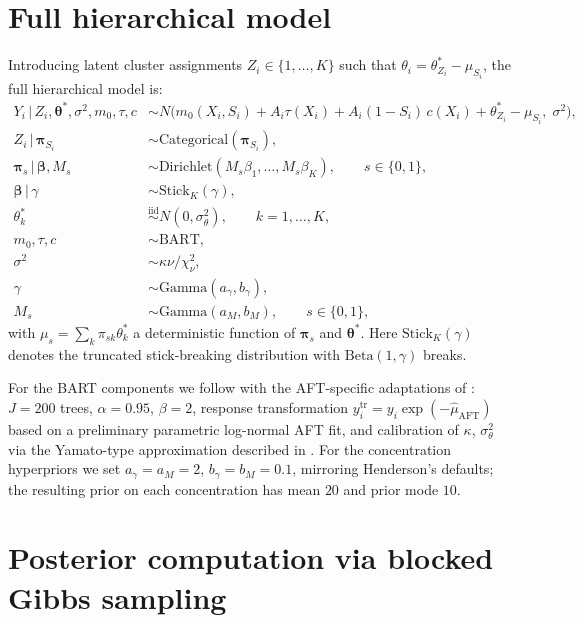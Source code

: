 \documentclass[11pt]{article}
\theoremstyle{plain}
\theoremstyle{definition}
\theoremstyle{remark}
\newcommand{\1}{\mathds{1}}
\newcommand{\given}{\,|\,}
\begin{document}
\section{Full hierarchical model}

Introducing latent cluster assignments $Z_i \in \{1, \ldots, K\}$ such that $\theta_i = \theta_{Z_i}^* - \mu_{S_i}$, the full hierarchical model is:
\begin{align}
Y_i \given Z_i, \bm{\theta}^*, \sigma^2, m_0, \tau, c &\sim N\!\big(m_0(X_i, S_i) + A_i \tau(X_i) + A_i(1 - S_i)\, c(X_i) + \theta_{Z_i}^* - \mu_{S_i},\; \sigma^2\big), \label{eq:lik} \\
Z_i \given \bm{\pi}_{S_i} &\sim \mathrm{Categorical}(\bm{\pi}_{S_i}), \\
\bm{\pi}_s \given \bm{\beta}, M_s &\sim \mathrm{Dirichlet}(M_s \beta_1, \ldots, M_s \beta_K), \qquad s \in \{0, 1\}, \\
\bm{\beta} \given \gamma &\sim \mathrm{Stick}_K(\gamma), \\
\theta_k^* &\stackrel{\mathrm{iid}}{\sim} N(0, \sigma_\theta^2), \qquad k = 1, \ldots, K, \\
m_0, \tau, c &\sim \mathrm{BART}, \\
\sigma^2 &\sim \kappa\nu / \chi^2_\nu, \\
\gamma &\sim \mathrm{Gamma}(a_\gamma, b_\gamma), \\
M_s &\sim \mathrm{Gamma}(a_M, b_M), \qquad s \in \{0, 1\},
\end{align}
with $\mu_s = \sum_k \pi_{sk} \theta_k^*$ a deterministic function of $\bm{\pi}_s$ and $\bm{\theta}^*$. Here $\mathrm{Stick}_K(\gamma)$ denotes the truncated stick-breaking distribution with $\mathrm{Beta}(1, \gamma)$ breaks.

For the BART components we follow \citet{chipman2010bart} with the AFT-specific adaptations of \citet{henderson2020individualized}: $J = 200$ trees, $\alpha = 0.95$, $\beta = 2$, response transformation $y_i^{\mathrm{tr}} = y_i \exp(-\hat\mu_{\mathrm{AFT}})$ based on a preliminary parametric log-normal AFT fit, and calibration of $\kappa$, $\sigma_\theta^2$ via the Yamato-type approximation described in \citet[Section 2.4]{henderson2020individualized}. For the concentration hyperpriors we set $a_\gamma = a_M = 2$, $b_\gamma = b_M = 0.1$, mirroring Henderson's defaults; the resulting prior on each concentration has mean $20$ and prior mode $10$.

\section{Posterior computation via blocked Gibbs sampling}
\end{document}
